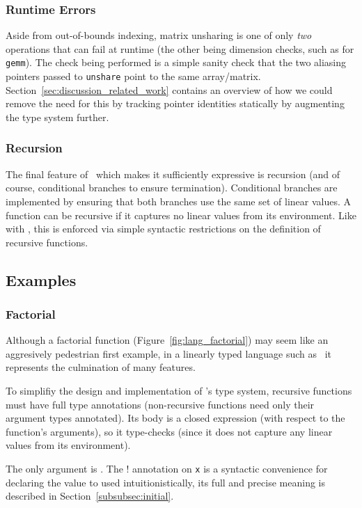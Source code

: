 \subsubsection{Runtime Errors}

Aside from out-of-bounds indexing, matrix unsharing is one of only \emph{two}
operations that can fail at runtime (the other being dimension checks, such as
for \texttt{gemm}). The check being performed is a simple sanity check that the
two aliasing pointers passed to \texttt{unshare} point to the same array/matrix.
Section~\ref{sec:discussion_related_work} contains an overview of how we could
remove the need for this by tracking pointer identities statically by
augmenting the type system further.

\subsubsection{Recursion}

The final feature of \lang\ which makes it sufficiently expressive is recursion
(and of course, conditional branches to ensure termination). Conditional
branches are implemented by ensuring that both branches use the same set of
linear values. A function can be recursive if it captures no linear values from
its environment. Like with , this is enforced via simple syntactic
restrictions on the definition of recursive functions.

\subsection{Examples}

\subsubsection{Factorial}

Although a factorial function (Figure~\ref{fig:lang_factorial}) may seem like
an aggresively pedestrian first example, in a linearly typed language such as
\lang\ it represents the culmination of many features.

To simplifiy the design and implementation of \lang's type system, recursive
functions must have full type annotations (non-recursive functions need only
their argument types annotated). Its body is a closed expression (with respect
to the function's arguments), so it type-checks (since it does not capture any
linear values from its environment).

The only argument is . The ! annotation on \texttt{x} is a
syntactic convenience for declaring the value to used intuitionistically, its
full and precise meaning is described in Section~\ref{subsubsec:initial}.

